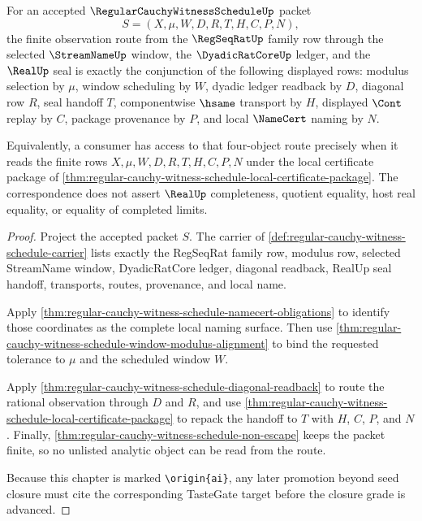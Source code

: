 \begin{theorem}
\label{thm:regular-cauchy-witness-schedule-finite-route-correspondence}
For an accepted $\RegularCauchyWitnessScheduleUp$ packet
$$
S=(X,\mu,W,D,R,T,H,C,P,N),
$$
the finite observation route from the $\RegSeqRatUp$ family row through the selected $\StreamNameUp$ window, the $\DyadicRatCoreUp$ ledger, and the $\RealUp$ seal is exactly the conjunction of the following displayed rows: modulus selection by $\mu$, window scheduling by $W$, dyadic ledger readback by $D$, diagonal row $R$, seal handoff $T$, componentwise $\hsame$ transport by $H$, displayed $\Cont$ replay by $C$, package provenance by $P$, and local $\NameCert$ naming by $N$.

Equivalently, a consumer has access to that four-object route precisely when it reads the finite rows $X,\mu,W,D,R,T,H,C,P,N$ under the local certificate package of \autoref{thm:regular-cauchy-witness-schedule-local-certificate-package}. The correspondence does not assert $\RealUp$ completeness, quotient equality, host real equality, or equality of completed limits.
\end{theorem}
\begin{proof}
Project the accepted packet $S$. The carrier of \autoref{def:regular-cauchy-witness-schedule-carrier} lists exactly the RegSeqRat family row, modulus row, selected StreamName window, DyadicRatCore ledger, diagonal readback, RealUp seal handoff, transports, routes, provenance, and local name.

Apply \autoref{thm:regular-cauchy-witness-schedule-namecert-obligations} to identify those coordinates as the complete local naming surface. Then use \autoref{thm:regular-cauchy-witness-schedule-window-modulus-alignment} to bind the requested tolerance to $\mu$ and the scheduled window $W$.

Apply \autoref{thm:regular-cauchy-witness-schedule-diagonal-readback} to route the rational observation through $D$ and $R$, and use \autoref{thm:regular-cauchy-witness-schedule-local-certificate-package} to repack the handoff to $T$ with $H$, $C$, $P$, and $N$. Finally, \autoref{thm:regular-cauchy-witness-schedule-non-escape} keeps the packet finite, so no unlisted analytic object can be read from the route.

Because this chapter is marked \texttt{\textbackslash origin\{ai\}}, any later promotion beyond seed closure must cite the corresponding TasteGate target before the closure grade is advanced.
\end{proof}

